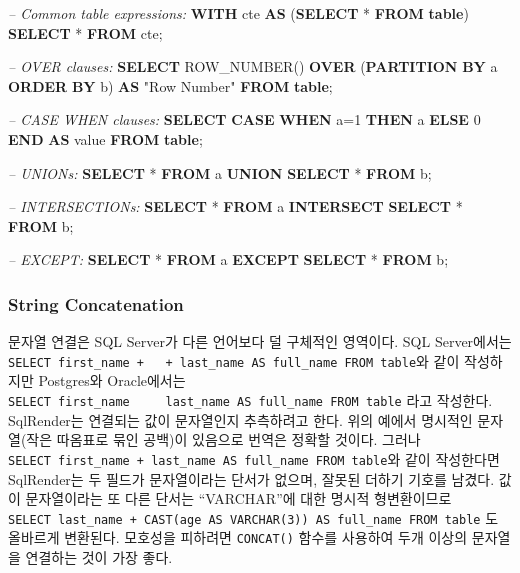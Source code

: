 \documentclass[11pt]{book}
\newenvironment{Shaded}{\begin{snugshade}}{\end{snugshade}}
\newcommand{\KeywordTok}[1]{\textcolor[rgb]{0.13,0.29,0.53}{\textbf{#1}}}
\newcommand{\DecValTok}[1]{\textcolor[rgb]{0.00,0.00,0.81}{#1}}
\newcommand{\CommentTok}[1]{\textcolor[rgb]{0.56,0.35,0.01}{\textit{#1}}}
\newcommand{\OtherTok}[1]{\textcolor[rgb]{0.56,0.35,0.01}{#1}}
\newcommand{\FunctionTok}[1]{\textcolor[rgb]{0.00,0.00,0.00}{#1}}
\newcommand{\NormalTok}[1]{#1}
\theoremstyle{definition}
\theoremstyle{definition}
\theoremstyle{definition}
\theoremstyle{remark}
\begin{document}
\begin{Shaded}
\begin{Highlighting}[]
\CommentTok{-- Common table expressions:}
\KeywordTok{WITH}\NormalTok{ cte }\KeywordTok{AS}\NormalTok{ (}\KeywordTok{SELECT}\NormalTok{ * }\KeywordTok{FROM} \KeywordTok{table}\NormalTok{) }\KeywordTok{SELECT}\NormalTok{ * }\KeywordTok{FROM}\NormalTok{ cte;}

\CommentTok{-- OVER clauses:}
\KeywordTok{SELECT} \FunctionTok{ROW_NUMBER}\NormalTok{() }\KeywordTok{OVER}\NormalTok{ (}\KeywordTok{PARTITION} \KeywordTok{BY}\NormalTok{ a }\KeywordTok{ORDER} \KeywordTok{BY}\NormalTok{ b)}
  \KeywordTok{AS} \OtherTok{"Row Number"} \KeywordTok{FROM} \KeywordTok{table}\NormalTok{;}
  
\CommentTok{-- CASE WHEN clauses:}
\KeywordTok{SELECT} \KeywordTok{CASE} \KeywordTok{WHEN}\NormalTok{ a=}\DecValTok{1} \KeywordTok{THEN}\NormalTok{ a }\KeywordTok{ELSE} \DecValTok{0} \KeywordTok{END} \KeywordTok{AS} \FunctionTok{value} \KeywordTok{FROM} \KeywordTok{table}\NormalTok{;}

\CommentTok{-- UNIONs:}
\KeywordTok{SELECT}\NormalTok{ * }\KeywordTok{FROM}\NormalTok{ a }\KeywordTok{UNION} \KeywordTok{SELECT}\NormalTok{ * }\KeywordTok{FROM}\NormalTok{ b;}

\CommentTok{-- INTERSECTIONs:}
\KeywordTok{SELECT}\NormalTok{ * }\KeywordTok{FROM}\NormalTok{ a }\KeywordTok{INTERSECT} \KeywordTok{SELECT}\NormalTok{ * }\KeywordTok{FROM}\NormalTok{ b;}

\CommentTok{-- EXCEPT:}
\KeywordTok{SELECT}\NormalTok{ * }\KeywordTok{FROM}\NormalTok{ a }\KeywordTok{EXCEPT} \KeywordTok{SELECT}\NormalTok{ * }\KeywordTok{FROM}\NormalTok{ b;}
\end{Highlighting}
\end{Shaded}

\subsubsection*{String Concatenation}\label{string-concatenation}

문자열 연결은 SQL Server가 다른 언어보다 덜 구체적인 영역이다. SQL
Server에서는
\texttt{SELECT\ first\_name\ +\ \textquotesingle{}\ \textquotesingle{}\ +\ last\_name\ AS\ full\_name\ FROM\ table}와
같이 작성하지만 Postgres와 Oracle에서는
\texttt{SELECT\ first\_name\ \textbar{}\textbar{}\ \textquotesingle{}\ \textquotesingle{}\ \textbar{}\textbar{}\ last\_name\ AS\ full\_name\ FROM\ table}
라고 작성한다. SqlRender는 연결되는 값이 문자열인지 추측하려고 한다.
위의 예에서 명시적인 문자열(작은 따옴표로 묶인 공백)이 있음으로 번역은
정확할 것이다. 그러나
\texttt{SELECT\ first\_name\ +\ last\_name\ AS\ full\_name\ FROM\ table}와
같이 작성한다면 SqlRender는 두 필드가 문자열이라는 단서가 없으며, 잘못된
더하기 기호를 남겼다. 값이 문자열이라는 또 다른 단서는 ``VARCHAR''에
대한 명시적 형변환이므로
\texttt{SELECT\ last\_name\ +\ CAST(age\ AS\ VARCHAR(3))\ AS\ full\_name\ FROM\ table}
도 올바르게 변환된다. 모호성을 피하려면 \texttt{CONCAT()} 함수를
사용하여 두개 이상의 문자열을 연결하는 것이 가장 좋다.
\end{document}
